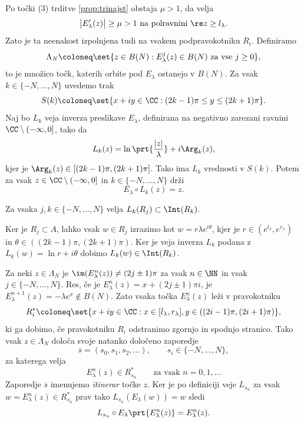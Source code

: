 Po točki (3) trditve \ref{prop:trinajst} obstaja \(\mu > 1\), da velja
\begin{equation} \label{eqn:mu-ocena}
    \bigl| E_\lambda' (z) \bigr| \geq \mu > 1 \text{ na polravnini } \re z \geq l_\lambda.
\end{equation}
Zato je ta neenakost izpolnjena tudi na vsakem podpravokotniku \(R_i\). Definiramo
\[\Lambda_N \coloneq \set{z \in B(N) : E_\lambda^j (z) \in B (N) \text{ za vse } j \geq 0},\]
to je množico točk, katerih orbite pod \(E_\lambda\) ostanejo v \(B (N)\). Za vsak \(k \in \{ -N, \dots, N \}\) uvedemo trak
\[S (k) \coloneq \set{x + i y \in \CC : (2k - 1) \pi \leq y \leq (2k + 1) \pi}.\]
Naj bo \(L_k\) veja inverza preslikave \(E_\lambda\), definirana na negativno zarezani ravnini \(\CC \setminus (- \infty, 0]\), tako da
\[L_k (z) = \ln \prt{\frac{|z|}{\lambda}} + i \Arg_k (z),\]
kjer je \(\Arg_k (z) \in [(2k - 1) \pi, (2k + 1) \pi]\). Tako ima \(L_k\) vrednosti v \(S (k)\). Potem za vsak \(z \in \CC \setminus (- \infty, 0]\) in \(k \in \{ - N, \dots, N \}\) drži
\begin{equation} \label{eqn:inverz-e}
    E_\lambda \circ L_k (z) = z.
\end{equation}

\begin{trditev} \label{prop:claim}
    Za vsaka \(j, k \in \{-N, \dots, N\}\) velja \(L_k (R_j) \subset \Int (R_k)\).
\end{trditev}

\begin{dokaz}
    Ker je \(R_j \subset A\), lahko vsak \(w \in R_j\) izrazimo kot \(w = r \lambda e^{i \theta}\), kjer je \(r \in (e^{l_\lambda}, e^{r_\lambda})\) in \(\theta \in ((2k - 1) \pi, (2k + 1) \pi)\). Ker je veja inverza \(L_k\) podana z \(L_k (w) = \ln r + i \theta\) dobimo \(L_k (w) \in \Int (R_k)\).
\end{dokaz}

Za neki \(z \in \Lambda_N\) je \(\im (E_\lambda^n (z)) \neq (2j \pm 1) \pi\) za vsak \(n \in \NN\) in vsak \(j \in \{ -N, \dots, N \}\). Res, če je \(E_\lambda^n (z) = x + (2j \pm 1) \pi i\), je \(E_\lambda^{n + 1} (z) = - \lambda e^x \notin B (N)\). Zato vsaka točka \(E_\lambda^n (z)\) leži v pravokotniku
\[R_i^* \coloneq \set{x + iy \in \CC : x \in [l_\lambda, r_\lambda], y \in ((2i - 1) \pi, (2i + 1) \pi)},\]
ki ga dobimo, če pravokotniku \(R_i\) odstranimo zgornjo in spodnjo stranico. Tako vsak \(z \in \Lambda_N\) določa svoje natanko določeno zaporedje
\[\overline{s} = (s_0, s_1, s_2, \dots), \qquad s_i \in \{-N, \dots, N\},\]
za katerega velja
\begin{equation} \label{eqn:itinerar}
    E_\lambda^n (z) \in R_{s_n}^* \qquad \text{za vsak } n = 0, 1, \dots
\end{equation}
Zaporedje \(\overline{s}\) imenujemo \emph{itinerar} točke \(z\). Ker je po definiciji veje \(L_{s_n}\) za vsak \(w = E_\lambda^n (z) \in R_{s_n}^*\) prav tako \(L_{s_n} (E_\lambda (w)) = w\) sledi
\begin{equation} \label{eqn:devetpet}
    L_{s_n} \circ E_\lambda \prt{E_\lambda^n (z)} = E_\lambda^n (z).
\end{equation}

